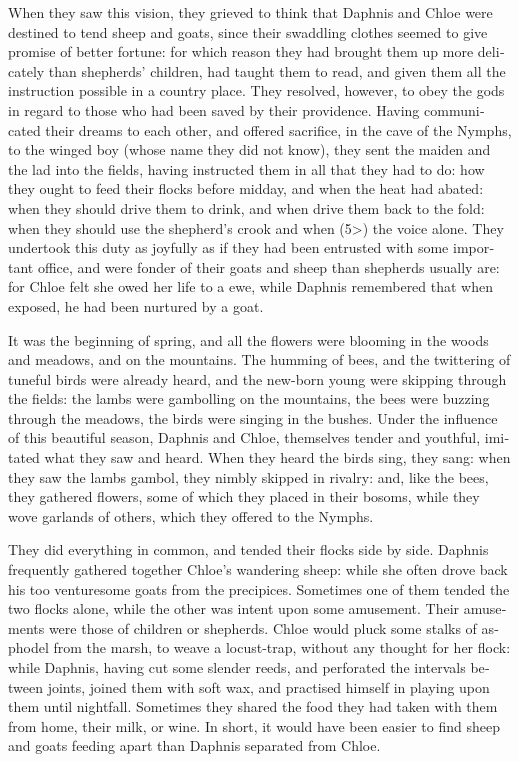 \documentclass{book}
\begin{document}
\begin{pairs}
\begin{Rightside}
\begin{english}
  When they saw this vision, they grieved to think that Daphnis and Chloe were destined to tend sheep and goats, since their swaddling clothes seemed to give promise of better fortune: for which reason they had brought them up more delicately than shepherds' children, had taught them to read, and given them all the instruction possible in a country place.  They resolved, however, to obey the gods in regard to those who had been saved by their providence.  Having communicated their dreams to each other, and offered sacrifice, in the cave of the Nymphs, to the winged boy (whose name they did not know), they sent the maiden and the lad into the fields, having instructed them in all that they had to do: how they ought to feed their flocks before midday, and when the heat had abated: when they should drive them to drink, and when drive them back to the fold: when they should use the shepherd's crook and when (5>) the voice alone.  They undertook this duty as joyfully as if they had been entrusted with some important office, and were fonder of their goats and sheep than shepherds usually are: for Chloe felt she owed her life to a ewe, while Daphnis remembered that when exposed, he had been nurtured by a goat.
\pend


  It was the beginning of spring, and all the flowers were blooming in the woods and meadows, and on the mountains.  The humming of bees, and the twittering of tuneful birds were already heard, and the new-born young were skipping through the fields: the lambs were gambolling on the mountains, the bees were buzzing through the meadows, the birds were singing in the bushes.  Under the influence of this beautiful season, Daphnis and Chloe, themselves tender and youthful, imitated what they saw and heard.  When they heard the birds sing, they sang: when they saw the lambs gambol, they nimbly skipped in rivalry: and, like the bees, they gathered flowers, some of which they placed in their bosoms, while they wove garlands of others, which they offered to the Nymphs.
\pend


  They did everything in common, and tended their flocks side by side.  Daphnis frequently gathered together Chloe's wandering sheep: while she often drove back his too venturesome goats from the precipices.  Sometimes one of them tended the two flocks alone, while the other was intent upon some amusement.  Their amusements were those of children or shepherds.  Chloe would pluck some stalks of asphodel from the marsh, to weave a locust-trap, without any thought for her flock: while Daphnis, having cut some slender reeds, and perforated the intervals between joints, joined them with soft wax, and practised himself in playing upon them until nightfall.  Sometimes they shared the food they had taken with them from home, their milk, or wine.  In short, it would have been easier to find sheep and goats feeding apart than Daphnis separated from Chloe.
\pend



\end{english}
\end{Rightside}
\end{pairs}
\end{document}
